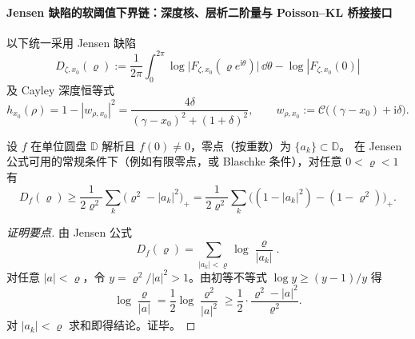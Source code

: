 \paragraph{Jensen 缺陷的软阈值下界链：深度核、层析二阶量与 Poisson--KL 桥接接口}
以下统一采用 Jensen 缺陷
\[
D_{\zeta,x_0}(\varrho)
:=\frac1{2\pi}\int_0^{2\pi}\log\bigl|F_{\zeta,x_0}(\varrho e^{\mathrm{i}\theta})\bigr|\,\dd\theta-\log|F_{\zeta,x_0}(0)|
\]
及 Cayley 深度恒等式
\[
h_{x_0}(\rho)=1-|w_{\rho,x_0}|^2
=\frac{4\delta}{(\gamma-x_0)^2+(1+\delta)^2},
\qquad
w_{\rho,x_0}:=\mathcal C\!\bigl((\gamma-x_0)+\mathrm{i}\delta\bigr).
\]

\begin{conclusion}\label{con:xi-jensen-soft-threshold-depth-lower-bound}
设 \(f\) 在单位圆盘 \(\mathbb D\) 解析且 \(f(0)\neq 0\)，零点（按重数）为 \(\{a_k\}\subset\mathbb D\)。
在 Jensen 公式可用的常规条件下（例如有限零点，或 Blaschke 条件），对任意 \(0<\varrho<1\) 有
\[
D_f(\varrho)
\ge
\frac1{2\varrho^2}\sum_k\bigl(\varrho^2-|a_k|^2\bigr)_+
=
\frac1{2\varrho^2}\sum_k\bigl((1-|a_k|^2)-(1-\varrho^2)\bigr)_+.
\]
\end{conclusion}
\begin{proof}[证明要点]
由 Jensen 公式
\[
D_f(\varrho)=\sum_{|a_k|<\varrho}\log\frac{\varrho}{|a_k|}.
\]
对任意 \(|a|<\varrho\)，令 \(y=\varrho^2/|a|^2>1\)。由初等不等式
\(
\log y\ge (y-1)/y
\)
得
\[
\log\frac{\varrho}{|a|}
=\frac12\log\frac{\varrho^2}{|a|^2}
\ge
\frac12\cdot\frac{\varrho^2-|a|^2}{\varrho^2}.
\]
对 \(|a_k|<\varrho\) 求和即得结论。证毕。
\end{proof}


